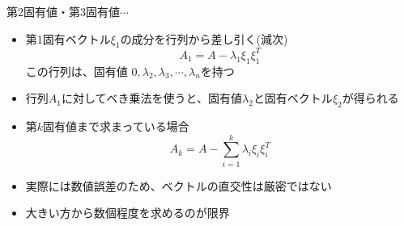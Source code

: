 \begin{frame}[t,fragile]{第2固有値・第3固有値$\cdots$}
  \begin{itemize}
  \item 第1固有ベクトル$\xi_1$の成分を行列から差し引く(減次)
    \[
    A_1 = A - \lambda_1 \xi_1 \xi_1^T
    \]
    この行列は、固有値 $0,\lambda_2,\lambda_3,\cdots,\lambda_n$を持つ
  \item 行列$A_1$に対してべき乗法を使うと、固有値$\lambda_2$と固有ベクトル$\xi_2$が得られる
  \item 第$k$固有値まで求まっている場合
    \[
    A_k = A - \sum_{i=1}^k \lambda_i \xi_i \xi_i^T
    \]
  \item 実際には数値誤差のため、ベクトルの直交性は厳密ではない
  \item 大きい方から数個程度を求めるのが限界
  \end{itemize}
\end{frame}
